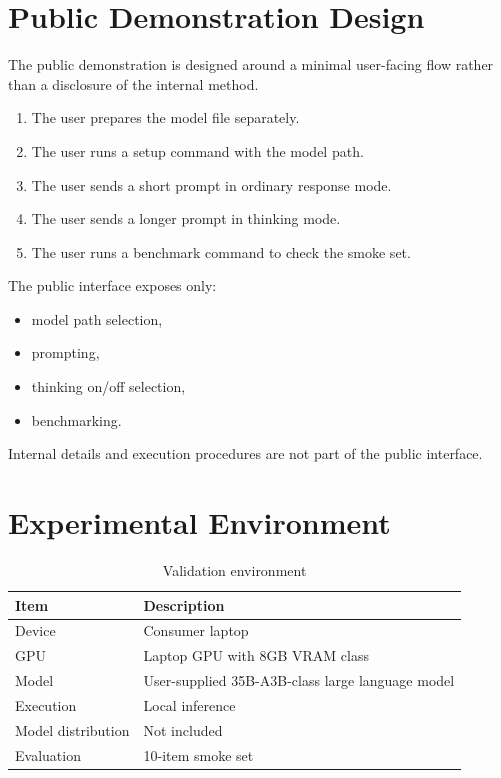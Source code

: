 \documentclass[11pt]{article}
\begin{document}
\section{Public Demonstration Design}

The public demonstration is designed around a minimal user-facing flow rather than a disclosure of the internal method.

\begin{enumerate}[leftmargin=1.5em]
  \item The user prepares the model file separately.
  \item The user runs a setup command with the model path.
  \item The user sends a short prompt in ordinary response mode.
  \item The user sends a longer prompt in thinking mode.
  \item The user runs a benchmark command to check the smoke set.
\end{enumerate}

The public interface exposes only:

\begin{itemize}[leftmargin=1.5em]
  \item model path selection,
  \item prompting,
  \item thinking on/off selection,
  \item benchmarking.
\end{itemize}

Internal details and execution procedures are not part of the public interface.

\section{Experimental Environment}

\begin{table}[h]
\centering
\begin{tabular}{ll}
\toprule
Item & Description \\
\midrule
Device & Consumer laptop \\
GPU & Laptop GPU with 8GB VRAM class \\
Model & User-supplied 35B-A3B-class large language model \\
Execution & Local inference \\
Model distribution & Not included \\
Evaluation & 10-item smoke set \\
\bottomrule
\end{tabular}
\caption{Validation environment}
\end{table}
\end{document}
